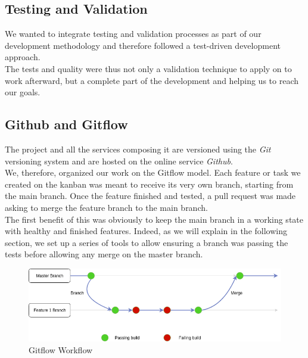 \documentclass{eplmastersthesis}
\begin{document}
        \subsection{Testing and Validation}

          We wanted to integrate testing and
          validation processes as part of our development methodology and
          therefore followed a test-driven development approach.\\
          The tests and quality were thus not only a validation technique to
          apply on to work afterward, but a complete part of the development
          and helping us to reach our goals.

        \subsection{Github and Gitflow}

          The project and all the services composing it are versioned using the
          \textit{Git} versioning system and are hosted on the online service
          \textit{Github}.\\
          We, therefore, organized our work on the Gitflow model. Each feature or
          task we created on the kanban was meant to receive its very own
          branch, starting from the main branch.
          Once the feature finished and tested, a pull request was made asking
          to merge the feature branch to the main branch.\\
          The first benefit of this was obviously to keep the main branch in
          a working state with healthy and finished features. Indeed, as
          we will explain in the following section, we set up a series of tools
          to allow ensuring a branch was passing the tests before allowing any
          merge on the master branch.\\

          \begin{figure}[H]
            \centering
            \includegraphics[scale=0.6]{figures/gitflow.png}
            \caption{\label{prev_arch} Gitflow Workflow}
          \end{figure}
\end{document}
